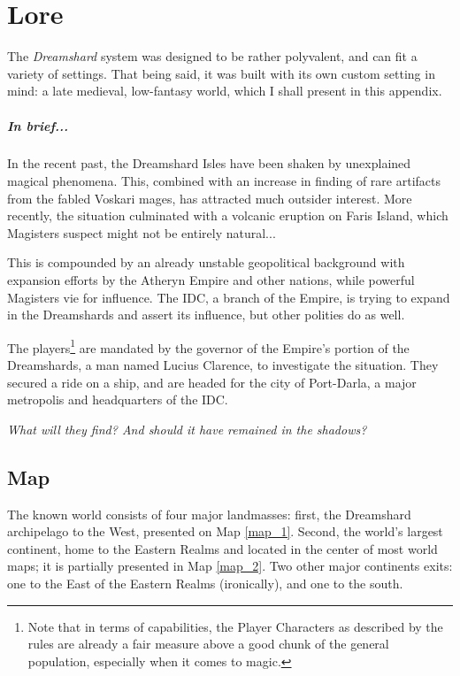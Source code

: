 \chapter{Lore}

The \textit{Dreamshard} system was designed to be rather polyvalent, and can fit a variety of settings. That being said, it was built with its own custom setting in mind: a late medieval, low-fantasy world, which I shall present in this appendix.

\paragraph{In brief...}

In the recent past, the Dreamshard Isles have been shaken by unexplained magical phenomena. This, combined with an increase in finding of rare artifacts from the fabled Voskari mages, has attracted much outsider interest. More recently, the situation culminated with a volcanic eruption on Faris Island, which Magisters suspect might not be entirely natural... 

This is compounded by an already unstable geopolitical background with expansion efforts by the Atheryn Empire and other nations, while powerful Magisters vie for influence. The IDC, a branch of the Empire, is trying to expand in the Dreamshards and assert its influence, but other polities do as well. 

The players\footnote{Note that in terms of capabilities, the Player Characters as described by the rules are already a fair measure above a good chunk of the general population, especially when it comes to magic.} are mandated by the governor of the Empire's portion of the Dreamshards, a man named Lucius Clarence, to investigate the situation. They secured a ride on a ship, and are headed for the city of Port-Darla, a major metropolis and headquarters of the IDC.

\textit{What will they find? And should it have remained in the shadows?}


\section{Map}

The known world consists of four major landmasses: first, the Dreamshard archipelago to the West, presented on Map \ref{map_1}. Second, the world's largest continent, home to the Eastern Realms and located in the center of most world maps; it is partially presented in Map \ref{map_2}. Two other major continents exits: one to the East of the Eastern Realms (ironically), and one to the south.


